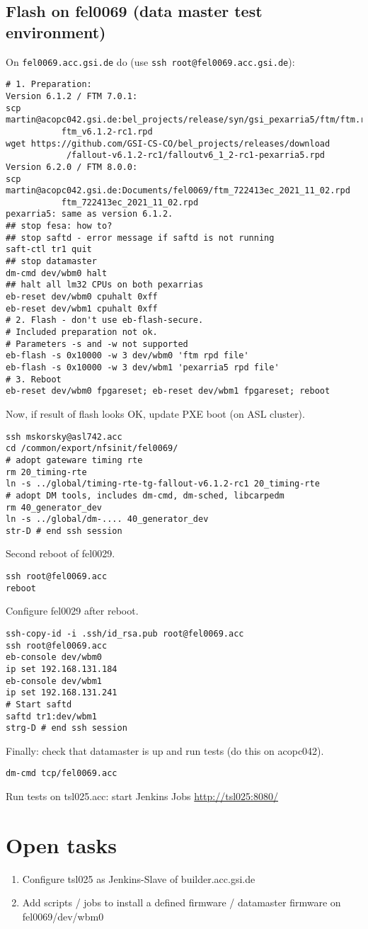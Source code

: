 \documentclass[12pt,a4paper]{report}
\begin{document}
\subsection{Flash on fel0069 (data master test environment)}
On \texttt{fel0069.acc.gsi.de} do (use \texttt{ssh root@fel0069.acc.gsi.de}):
\begin{verbatim}
# 1. Preparation:
Version 6.1.2 / FTM 7.0.1:
scp martin@acopc042.gsi.de:bel_projects/release/syn/gsi_pexarria5/ftm/ftm.rpd
           ftm_v6.1.2-rc1.rpd
wget https://github.com/GSI-CS-CO/bel_projects/releases/download
            /fallout-v6.1.2-rc1/falloutv6_1_2-rc1-pexarria5.rpd
Version 6.2.0 / FTM 8.0.0:
scp martin@acopc042.gsi.de:Documents/fel0069/ftm_722413ec_2021_11_02.rpd
           ftm_722413ec_2021_11_02.rpd
pexarria5: same as version 6.1.2.
## stop fesa: how to?
## stop saftd - error message if saftd is not running
saft-ctl tr1 quit
## stop datamaster
dm-cmd dev/wbm0 halt
## halt all lm32 CPUs on both pexarrias
eb-reset dev/wbm0 cpuhalt 0xff
eb-reset dev/wbm1 cpuhalt 0xff
# 2. Flash - don't use eb-flash-secure.
# Included preparation not ok.
# Parameters -s and -w not supported
eb-flash -s 0x10000 -w 3 dev/wbm0 'ftm rpd file'
eb-flash -s 0x10000 -w 3 dev/wbm1 'pexarria5 rpd file'
# 3. Reboot
eb-reset dev/wbm0 fpgareset; eb-reset dev/wbm1 fpgareset; reboot
\end{verbatim}
Now, if result of flash looks OK, update PXE boot (on ASL cluster).
\begin{verbatim}
ssh mskorsky@asl742.acc
cd /common/export/nfsinit/fel0069/
# adopt gateware timing rte
rm 20_timing-rte
ln -s ../global/timing-rte-tg-fallout-v6.1.2-rc1 20_timing-rte
# adopt DM tools, includes dm-cmd, dm-sched, libcarpedm
rm 40_generator_dev
ln -s ../global/dm-.... 40_generator_dev
str-D # end ssh session
\end{verbatim}
Second reboot of fel0029.
\begin{verbatim}
ssh root@fel0069.acc
reboot
\end{verbatim}
Configure fel0029 after reboot.
\begin{verbatim}
ssh-copy-id -i .ssh/id_rsa.pub root@fel0069.acc
ssh root@fel0069.acc
eb-console dev/wbm0
ip set 192.168.131.184
eb-console dev/wbm1
ip set 192.168.131.241
# Start saftd
saftd tr1:dev/wbm1
strg-D # end ssh session
\end{verbatim}
Finally: check that datamaster is up and run tests (do this on acopc042).
\begin{verbatim}
dm-cmd tcp/fel0069.acc
\end{verbatim}
Run tests on tsl025.acc: start Jenkins Jobs \url{http://tsl025:8080/}

\section{Open tasks}
\begin{enumerate}
\item Configure tsl025 as Jenkins-Slave of builder.acc.gsi.de
\item Add scripts / jobs to install a defined firmware / datamaster firmware on fel0069/dev/wbm0
\end{enumerate}
\end{document}
